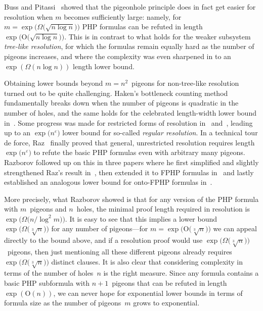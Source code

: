 \documentclass{article}
\newcommand{\Bigoh}[1]{\mathrm{O} \bigl( #1 \bigr)}
\newcommand{\bigoh}[1]{\mathrm{O} ( #1 )}
\newcommand{\Bigomega}[1]{\Omega \bigl( #1 \bigr)}
\newcommand{\bigomega}[1]{\Omega ( #1 )}
\newcommand{\introduceterm}[1]{{\emph{#1}}}
\numberwithin{equation}{section}
\begin{document}
Buss and Pitassi~\cite{BP97Weak} showed that the pigeonhole principle
does in fact get easier for resolution when $m$ becomes sufficiently
large: namely, for 
$m = \exp \bigl( \Bigomega{\sqrt{n \log n}} \bigr)$
PHP formulas can be refuted in length
$\exp \bigl( \Bigoh{ \sqrt{n \log n} } \bigr)$.
This is in contrast to 
what holds for the  
weaker subsystem
\introduceterm{tree-like resolution},
for which 
the
formulas remain equally hard as the number of pigeons
increases, and where the 
complexity was even sharpened in  
\cite{BGL10,BP97Weak,Dant02,DantRiis01}
to an
$\exp ( \bigomega{ n \log n} )$ 
length
lower bound.

Obtaining lower bounds beyond $m = n^2$~pigeons for non-tree-like
resolution turned out to be quite challenging.
Haken's bottleneck counting method fundamentally breaks down when the
number of pigeons is quadratic in the number of holes, and the same
holds for the celebrated length-width lower bound
in~\cite{BW01ShortProofs}. 
Some progress was made for 
restricted forms of
resolution
in~\cite{RazbWigYao02} and~\cite{PitRaz04},
leading up to an
$\exp \bigl( n^\varepsilon \bigr)$
lower bound for so-called \introduceterm{regular resolution}.
In a technical tour de force, 
Raz~\cite{Raz04Resolution} finally proved 
that general, unrestricted resolution requires length
$\exp \bigl( n^\varepsilon \bigr)$
to refute the basic PHP formulas even with arbitrary many pigeons.
Razborov followed up on this in three papers where he first 
simplified and slightly strengthened 
Raz's result in~\cite{Razborov01ImprovedResolutionLowerBoundsWPHP},
then extended it to FPHP formulas
in~\cite{Razborov03ResolutionLowerBoundsWFPHP} 
and lastly established an analogous lower bound for onto-FPHP formulas
in~\cite{Razborov04ResolutionLowerBoundsPM}.


More precisely, what Razborov showed is that for any version of the PHP
formula with $m$~pigeons and $n$~holes, the minimal proof length
required in resolution is
$
\exp \bigl( \Bigomega{n / \log^2 m } \bigr)
$.
It is easy to see that this implies a lower bound
$
\exp \bigl( \Bigomega{\sqrt[3]{n} } \bigr)
$
for any number of pigeons---for 
$m = \exp \bigl( \Bigoh{\sqrt[3]{n}} \bigr)$
we can appeal directly to the bound above, and if a resolution proof
would use 
$\exp\bigl(\Bigomega{\sqrt[3]{n}} \bigr)$~pigeons, 
then just mentioning all these
different pigeons already requires
$\exp\bigl( \Bigomega{ \sqrt[3]{n} } \bigr)$ distinct clauses.
It is also clear that considering complexity in terms of the number of
holes~$n$ is the right measure. Since any formula contains a basic PHP
subformula with $n+1$~pigeons that can be refuted in
length~$\exp(\bigoh{n})$,
we can never hope for exponential lower bounds in terms of formula
size as the number of pigeons~$m$ grows to exponential.
\end{document}

